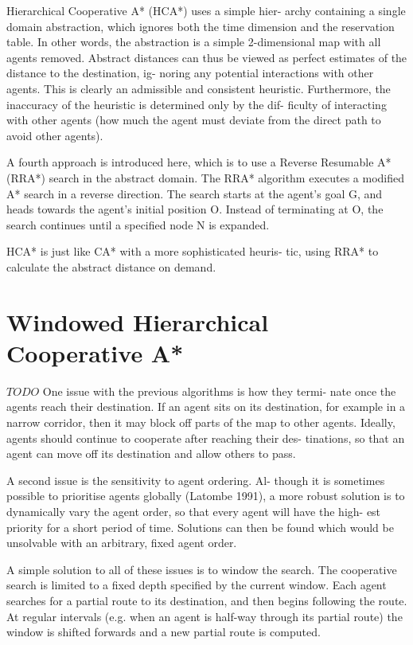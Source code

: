 Hierarchical Cooperative A* (HCA*) uses a simple hier-
archy containing a single domain abstraction, which ignores
both the time dimension and the reservation table. In other
words, the abstraction is a simple 2-dimensional map with
all agents removed. Abstract distances can thus be viewed
as perfect estimates of the distance to the destination, ig-
noring any potential interactions with other agents. This is
clearly an admissible and consistent heuristic. Furthermore,
the inaccuracy of the heuristic is determined only by the dif-
ficulty of interacting with other agents (how much the agent
must deviate from the direct path to avoid other agents).

A fourth approach is introduced here, which is to use a Reverse
Resumable A* (RRA*) search in the abstract domain.
The RRA* algorithm executes a modified A* search in a
reverse direction. The search starts at the agent’s goal G,
and heads towards the agent’s initial position O. Instead
of terminating at O, the search continues until a specified
node N is expanded.

HCA* is just like CA* with a more sophisticated heuris-
tic, using RRA* to calculate the abstract distance on demand.
\cite{cooppath}

\section{Windowed Hierarchical Cooperative A*}
$TODO$
One issue with the previous algorithms is how they termi-
nate once the agents reach their destination. If an agent sits
on its destination, for example in a narrow corridor, then
it may block off parts of the map to other agents. Ideally,
agents should continue to cooperate after reaching their des-
tinations, so that an agent can move off its destination and
allow others to pass.

A second issue is the sensitivity to agent ordering. Al-
though it is sometimes possible to prioritise agents globally
(Latombe 1991), a more robust solution is to dynamically
vary the agent order, so that every agent will have the high-
est priority for a short period of time. Solutions can then
be found which would be unsolvable with an arbitrary, fixed
agent order.

A simple solution to all of these issues is to window the
search. The cooperative search is limited to a fixed depth
specified by the current window. Each agent searches for a
partial route to its destination, and then begins following the
route. At regular intervals (e.g. when an agent is half-way
through its partial route) the window is shifted forwards and
a new partial route is computed.

